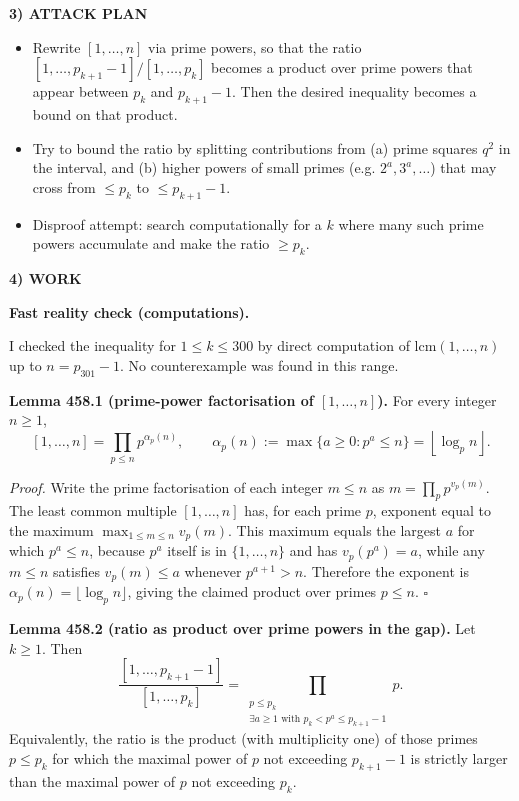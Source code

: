 \noindent\textbf{3) ATTACK PLAN}

\begin{itemize}
\item Rewrite $[1,\dots,n]$ via prime powers, so that the ratio
$[1,\dots,p_{k+1}-1]/[1,\dots,p_k]$
becomes a product over prime powers that appear between $p_k$ and $p_{k+1}-1$.
Then the desired inequality becomes a bound on that product.
\item Try to bound the ratio by splitting contributions from (a) prime squares $q^2$ in the interval, and (b) higher powers of small primes (e.g. $2^a,3^a,\dots$) that may cross from $\le p_k$ to $\le p_{k+1}-1$.
\item Disproof attempt: search computationally for a $k$ where many such prime powers accumulate and make the ratio $\ge p_k$.
\end{itemize}

\noindent\textbf{4) WORK}

\textbf{Fast reality check (computations).}

I checked the inequality for $1\le k\le 300$ by direct computation of $\mathrm{lcm}(1,\dots,n)$ up to $n=p_{301}-1$. No counterexample was found in this range.

\medskip
\noindent\textbf{Lemma 458.1 (prime-power factorisation of $[1,\dots,n]$).}
For every integer $n\ge 1$,
\[[1,\dots,n] = \prod_{p\le n} p^{\alpha_p(n)},\qquad \alpha_p(n):=\max\{a\ge 0: p^a\le n\}=\left\lfloor \log_p n\right\rfloor.
\]

\textit{Proof.}
Write the prime factorisation of each integer $m\le n$ as $m=\prod_{p} p^{v_p(m)}$.
The least common multiple $[1,\dots,n]$ has, for each prime $p$, exponent equal to the maximum $\max_{1\le m\le n} v_p(m)$. This maximum equals the largest $a$ for which $p^a\le n$, because $p^a$ itself is in $\{1,\dots,n\}$ and has $v_p(p^a)=a$, while any $m\le n$ satisfies $v_p(m)\le a$ whenever $p^{a+1}>n$. Therefore the exponent is $\alpha_p(n)=\lfloor\log_p n\rfloor$, giving the claimed product over primes $p\le n$. \hfill$\square$

\medskip
\noindent\textbf{Lemma 458.2 (ratio as product over prime powers in the gap).}
Let $k\ge 1$. Then
\[\frac{[1,\dots,p_{k+1}-1]}{[1,\dots,p_k]} = \prod_{\substack{p\le p_k\\ \exists a\ge 1\text{ with }p_k < p^a\le p_{k+1}-1}} p.
\]
Equivalently, the ratio is the product (with multiplicity one) of those primes $p\le p_k$ for which the maximal power of $p$ not exceeding $p_{k+1}-1$ is strictly larger than the maximal power of $p$ not exceeding $p_k$.

